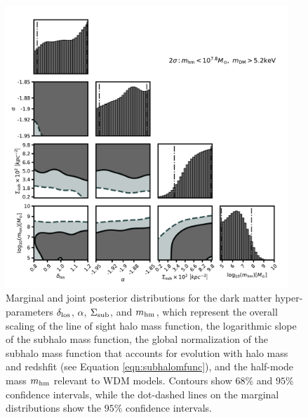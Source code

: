 \begin{figure}
	\includegraphics[clip,trim=0.2cm 0cm 0.5cm
	0.5cm,width=0.95\textwidth,keepaspectratio]{./figures_wdmchillsout/joint_inference.pdf}
	\caption[Joint posterior distribution of dark matter hyper-parameters]{\label{fig:mainresult} Marginal and joint posterior distributions for the dark matter hyper-parameters $\delta_{\rm{los}}$, $\alpha$, $\Sigma_{\rm{sub}}$, and ${m_{\rm{hm}}}$, which represent the overall scaling of the line of sight halo mass function, the logarithmic slope of the subhalo mass function, the global normalization of the subhalo mass function that accounts for evolution with halo mass and redshfit (see Equation \ref{eqn:subhalomfunc}), and the half-mode mass ${m_{\rm{hm}}}$ relevant to WDM models. Contours show $68\%$ and $95\%$ confidence intervals, while the dot-dashed lines on the marginal distributions show the $95\%$ confidence intervals.}
\end{figure}	

